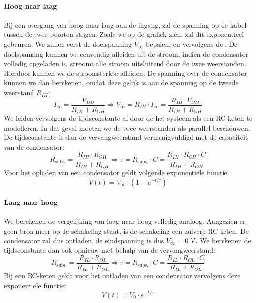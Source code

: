 \paragraph{Hoog naar laag}
Bij een overgang van hoog naar laag aan de ingang, zal de spanning op de kabel tussen de twee poorten stijgen. Zoals we op de grafiek zien, zal dit exponentieel gebeuren. We zullen eerst de doelspanning $V_{\infty}$ bepalen, en vervolgens de . De doelspanning kunnen we eenvoudig afleiden uit de stroom, indien de condensator volledig opgeladen is, stroomt alle stroom uitsluitend door de twee weerstanden. Hierdoor kunnen we de stroomsterkte afleiden. De spanning over de condensator kunnen we dan berekenen, omdat deze gelijk is aan de spanning op de tweede weerstand $R_{IH}$:
\begin{equation}
I_{\infty}=\displaystyle\frac{V_{DD}}{R_{IH}+R_{OH}}\Rightarrow V_{\infty}=R_{IH}\cdot I_{\infty}=\displaystyle\frac{R_{IH}\cdot V_{DD}}{R_{IH}+R_{OH}}
\label{eqn:vInfty}
\end{equation}
We leiden vervolgens de tijdsconstante af door de het systeem als een RC-keten te modelleren. In dat geval moeten we de twee weerstanden als parallel beschouwen. De tijdsconstante is dan de vervangweerstand vermenigvuldigd met de capaciteit van de condensator:
\begin{equation}
R_{\mbox{subs.}}=\displaystyle\frac{R_{IH}\cdot R_{OH}}{R_{IH}+R_{OH}}\Rightarrow \tau=R_{\mbox{subs.}}\cdot C=\displaystyle\frac{R_{IH}\cdot R_{OH}\cdot C}{R_{IH}+R_{OH}}
\label{eqn:tauHL}
\end{equation}
Voor het opladen van een condensator geldt volgende exponenti\"ele functie:
\begin{equation}
V\left(t\right)=V_{\infty}\cdot\left(1-e^{-t/\tau}\right)
\end{equation}
\paragraph{Laag naar hoog}
We berekenen de vergelijking van laag naar hoog volledig analoog. Aangezien er geen bron meer op de schakeling staat, is de schakeling een zuivere RC-keten. De condensator zal dus ontladen, de eindspanning is dus $V_{\infty}=0\mbox{ V}$. We berekenen de tijdsconstante dan ook opnieuw met behulp van de vervangweerstand:
\begin{equation}
R_{\mbox{subs.}}=\displaystyle\frac{R_{IL}\cdot R_{OL}}{R_{IL}+R_{OL}}\Rightarrow \tau=R_{\mbox{subs.}}\cdot C=\displaystyle\frac{R_{IL}\cdot R_{OL}\cdot C}{R_{IL}+R_{OL}}
\label{eqn:tauLH}
\end{equation}
Bij een RC-keten geldt voor het ontladen van een condensator vervolgens deze exponenti\"ele functie:
\begin{equation}
V\left(t\right)=V_0\cdot e^{-t/\tau}
\end{equation}
